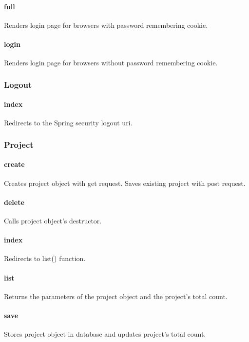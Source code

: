 \documentclass[12pt]{article}
\begin{document}
\paragraph{full} Renders login page for browsers with password remembering cookie.
\paragraph{login} Renders login page for browsers without password remembering cookie.

\subsubsection{Logout}\label{sec:CLogout}
\paragraph{index} Redirects to the Spring security logout uri.

\subsubsection{Project}\label{sec:CProject}
\paragraph{create} Creates project object with get request. Saves existing project with post request.
\paragraph{delete} Calls project object's destructor.
\paragraph{index} Redirects to list() function.
\paragraph{list} Returns the parameters of the project object and the project's total count.
\paragraph{save} Stores project object in database and updates project's total count.
\end{document}
